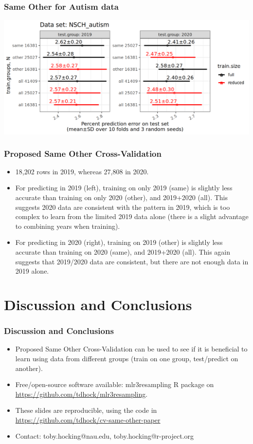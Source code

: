 \documentclass{beamer}
\begin{document}
\begin{frame}
  \frametitle{Same Other for Autism data}
  \includegraphics[width=\textwidth]{NSCH_autism_error_glmnet_sizes_mean_sd_more.png}
\end{frame}


\begin{frame}
  \frametitle{Proposed Same Other Cross-Validation}
  \begin{itemize}
  \item 18,202 rows in 2019, whereas 27,808 in 2020.
  \item For predicting in 2019 (left), training on only 2019 (same) is
    slightly less accurate than training on only 2020 (other), and
    2019+2020 (all). This suggests 2020 data are consistent with the
    pattern in 2019, which is too complex to learn from the limited
    2019 data alone (there is a slight advantage to combining years
    when training).
  \item For predicting in 2020 (right), training on 2019 (other) is slightly less accurate than training on 2020 (same), and 2019+2020 (all). This again suggests that 2019/2020 data are consistent, but there are not enough data in 2019 alone.
  \end{itemize}
\end{frame}

\section{Discussion and Conclusions}

\begin{frame}
  \frametitle{Discussion and Conclusions}
  \begin{itemize}
  \item Proposed Same Other Cross-Validation can be used to see if it
    is beneficial to learn using data from different groups (train on
    one group, test/predict on another).
  \item Free/open-source software available: mlr3resampling R package
    on \url{https://github.com/tdhock/mlr3resampling}.
  \item These slides are reproducible, using the code in \url{https://github.com/tdhock/cv-same-other-paper}
  \item Contact: toby.hocking@nau.edu,
    toby.hocking@r-project.org
  \end{itemize}
\end{frame}
\end{document}
